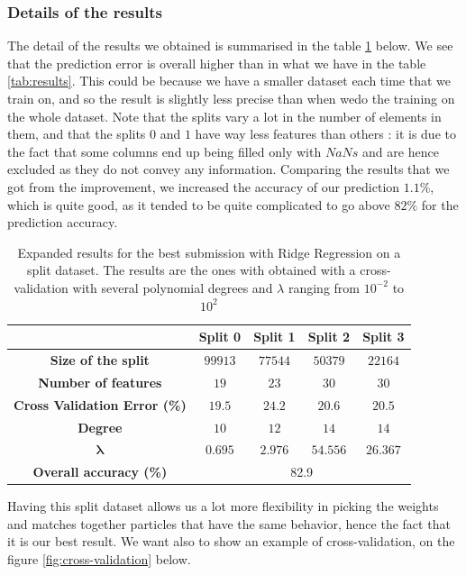 \documentclass[10pt,conference,compsocconf]{IEEEtran}
\begin{document}
\subsubsection{Details of the results}
The detail of the results we obtained is summarised in the table \ref{tab:RR} below. We see that the prediction error is overall higher than in what we have in the table \ref{tab:results}. This could be because we have a smaller dataset each time that we train on, and so the result is slightly less precise than when wedo the training on the whole dataset. Note that the splits vary a lot in the number of elements in them, and that the splits $0$ and $1$ have way less features than others : it is due to the fact that some columns end up being filled only with $NaNs$ and are hence excluded as they do not convey any information. Comparing the results that we got from the improvement, we increased the accuracy of our prediction $1.1\%$, which is quite good, as it tended to be quite complicated to go above  $82\%$ for the prediction accuracy.

\begin{table}[!ht]
	\centering
	\begin{tabular}{c||c|c|c|c}
		&\textbf{Split 0} & \textbf{Split 1} & \textbf{Split 2}& \textbf{Split 3}\\
		\hline
		\textbf{Size of the split} & $99913$ & $77544$& $50379$ & $22164$\\
		\hline
		\textbf{Number of features} & $19$ & $23$ & $30$ & $30$ \\
		\hline
		\textbf{Cross Validation Error (\%)} & $19.5$&$24.2$&$20.6$&$20.5$\\
		\hline
		\textbf{Degree} & $10$ & $12$ & $14$ & $14$ \\
		\hline
		{$\mathbf{\lambda}$} & $0.695$ & $2.976$ & $54.556$ & $26.367$\\
		\hline
		\hline
		\textbf{Overall accuracy (\%)} &  \multicolumn{4}{|c}{82.9}
	\end{tabular}
	\caption{Expanded results for the best submission with Ridge Regression on a split dataset. The results are the ones with obtained with a cross-validation with several polynomial degrees and $\lambda$ ranging from $10^{-2}$ to $10^{2}$}
	\label{tab:RR}
\end{table}

Having this split dataset allows us a lot more flexibility in picking the weights and matches together particles that have the same behavior, hence the fact that it is our best result. We want also to show an example of cross-validation, on the figure \ref{fig:cross-validation} below.
\end{document}
